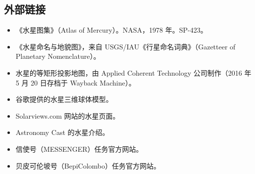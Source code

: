 \subsection{外部链接}
\begin{itemize}
\item 《水星图集》（Atlas of Mercury）。NASA，1978 年。SP-423。
\item 《水星命名与地貌图》，来自 USGS/IAU《行星命名词典》（Gazetteer of Planetary Nomenclature）。
\item 水星的等矩形投影地图，由 Applied Coherent Technology 公司制作（2016 年 5 月 20 日存档于 Wayback Machine）。
\item 谷歌提供的水星三维球体模型。
\item Solarviews.com 网站的水星页面。
\item Astronomy Cast 的水星介绍。
\item 信使号（MESSENGER）任务官方网站。
\item 贝皮可伦坡号（BepiColombo）任务官方网站。
\end{itemize}










